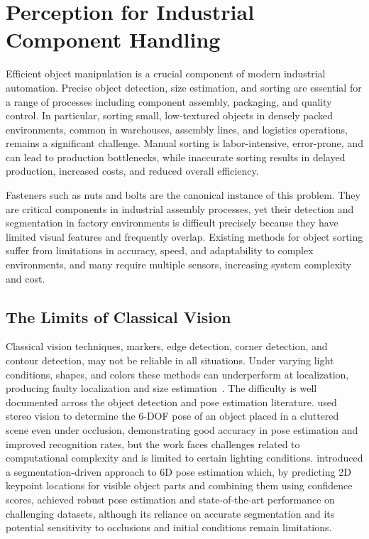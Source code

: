 \section{Perception for Industrial Component Handling}\label{sec:intro_perception}

Efficient object manipulation is a crucial component of modern industrial automation. Precise
object detection, size estimation, and sorting are essential for a range of processes including
component assembly, packaging, and quality control. In particular, sorting small, low-textured
objects in densely packed environments, common in warehouses, assembly lines, and logistics
operations, remains a significant challenge. Manual sorting is labor-intensive, error-prone,
and can lead to production bottlenecks, while inaccurate sorting results in delayed production,
increased costs, and reduced overall efficiency.

Fasteners such as nuts and bolts are the canonical instance of this problem. They are critical
components in industrial assembly processes, yet their detection and segmentation in factory
environments is difficult precisely because they have limited visual features and frequently
overlap. Existing methods for object sorting suffer from limitations in accuracy, speed, and
adaptability to complex environments, and many require multiple sensors, increasing system
complexity and cost.

\subsection{The Limits of Classical Vision}\label{subsec:intro_classical}

Classical vision techniques, markers, edge detection, corner detection, and contour detection,
may not be reliable in all situations. Under varying light conditions, shapes, and colors
these methods can underperform at localization, producing faulty localization and size
estimation~\citep{omahony2020deep}. The difficulty is well documented across the object detection and pose estimation literature. \citet{sumi2002object} used stereo vision to determine the 6-DOF pose of an object placed in a cluttered scene even under occlusion, demonstrating good accuracy in pose estimation and improved recognition rates, but the work faces challenges related to computational complexity and is limited to certain lighting conditions. \citet{hu2018segmentation} introduced a segmentation-driven approach to 6D pose estimation which, by predicting 2D keypoint locations for visible object parts and combining them using confidence scores, achieved robust pose estimation and state-of-the-art performance on challenging datasets, although its reliance on accurate segmentation and its potential sensitivity to occlusions and initial conditions remain
limitations.

